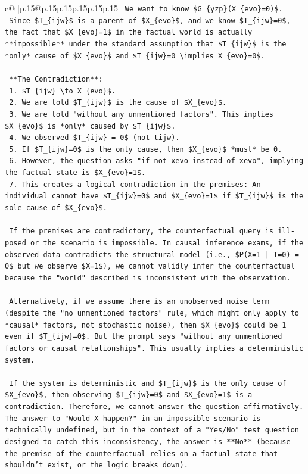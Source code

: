 \documentclass{article}
\begin{document}
{\begin{supertabular}{c@{$\;$}|p{.15\linewidth}@{}p{.15\linewidth}p{.15\linewidth}p{.15\linewidth}p{.15\linewidth}p{.15\linewidth}}
{{{\texttt{    We want to know \$G\_\{yzp\}(X\_\{evo\}=0)\$.} \\
\texttt{    Since \$T\_\{ijw\}\$ is a parent of \$X\_\{evo\}\$, and we know \$T\_\{ijw\}=0\$, the fact that \$X\_\{evo\}=1\$ in the factual world is actually **impossible** under the standard assumption that \$T\_\{ijw\}\$ is the *only* cause of \$X\_\{evo\}\$ and \$T\_\{ijw\}=0 \textbackslash{}implies X\_\{evo\}=0\$.} \\
\\ 
\texttt{    **The Contradiction**:} \\
\texttt{    1.  \$T\_\{ijw\} \textbackslash{}to X\_\{evo\}\$.} \\
\texttt{    2.  We are told \$T\_\{ijw\}\$ is the cause of \$X\_\{evo\}\$.} \\
\texttt{    3.  We are told "without any unmentioned factors". This implies \$X\_\{evo\}\$ is *only* caused by \$T\_\{ijw\}\$.} \\
\texttt{    4.  We observed \$T\_\{ijw\} = 0\$ (not tijw).} \\
\texttt{    5.  If \$T\_\{ijw\}=0\$ is the only cause, then \$X\_\{evo\}\$ *must* be 0.} \\
\texttt{    6.  However, the question asks "if not xevo instead of xevo", implying the factual state is \$X\_\{evo\}=1\$.} \\
\texttt{    7.  This creates a logical contradiction in the premises: An individual cannot have \$T\_\{ijw\}=0\$ and \$X\_\{evo\}=1\$ if \$T\_\{ijw\}\$ is the sole cause of \$X\_\{evo\}\$.} \\
\\ 
\texttt{    If the premises are contradictory, the counterfactual query is ill{-}posed or the scenario is impossible. In causal inference exams, if the observed data contradicts the structural model (i.e., \$P(X=1 | T=0) = 0\$ but we observe \$X=1\$), we cannot validly infer the counterfactual because the "world" described is inconsistent with the observation.} \\
\\ 
\texttt{    Alternatively, if we assume there is an unobserved noise term (despite the "no unmentioned factors" rule, which might only apply to *causal* factors, not stochastic noise), then \$X\_\{evo\}\$ could be 1 even if \$T\_\{ijw\}=0\$. But the prompt says "without any unmentioned factors or causal relationships". This usually implies a deterministic system.} \\
\\ 
\texttt{    If the system is deterministic and \$T\_\{ijw\}\$ is the only cause of \$X\_\{evo\}\$, then observing \$T\_\{ijw\}=0\$ and \$X\_\{evo\}=1\$ is a contradiction. Therefore, we cannot answer the question affirmatively. The answer to "Would X happen?" in an impossible scenario is technically undefined, but in the context of a "Yes/No" test question designed to catch this inconsistency, the answer is **No** (because the premise of the counterfactual relies on a factual state that shouldn't exist, or the logic breaks down).} \\
}}}
\end{supertabular}}
\end{document}
